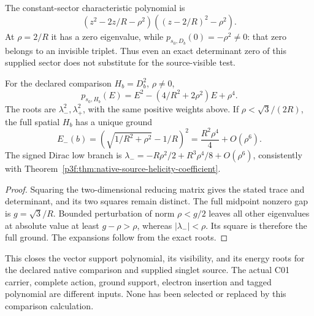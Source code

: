 \documentclass[12pt,a4paper]{article}
\begin{document}
\begin{corollary}
\label{p4:cor:native-source-determinant-zero}
The constant-sector characteristic polynomial is
\[
 (z^2-2z/R-\rho^2)((z-2/R)^2-\rho^2).
\]
At \(\rho=2/R\) it has a zero eigenvalue, while
\(p_{s_0,D_b}(0)=-\rho^2\ne0\): that zero belongs to an invisible
triplet. Thus even an exact determinant zero of this supplied sector
does not substitute for the source-visible test.
\end{corollary}

\begin{corollary}
\label{p4:cor:native-source-square-polynomial}
For the declared comparison \(H_b=D_b^2\), \(\rho\ne0\),
\begin{equation}
 p_{s_0,H_b}(E)=E^2-(4/R^2+2\rho^2)E+\rho^4.
 \label{p4:eq:native-source-energy-polynomial}
\end{equation}
The roots are \(\lambda_-^2,\lambda_+^2\), with the same positive
weights above. If \(\rho<\sqrt3/(2R)\), the full spatial \(H_b\)
has a unique ground
\begin{equation}
 E_-(b)=\left(\sqrt{1/R^2+\rho^2}-1/R\right)^2
       =\frac{R^2\rho^4}{4}+O(\rho^6).
 \label{p4:eq:native-source-quartic-energy}
\end{equation}
The signed Dirac low branch is
\(\lambda_-=-R\rho^2/2+R^3\rho^4/8+O(\rho^6)\), consistently with
Theorem~\ref{p3f:thm:native-source-helicity-coefficient}.
\end{corollary}
\begin{proof}
Squaring the two-dimensional reducing matrix gives the stated trace
and determinant, and its two squares remain distinct. The full
midpoint nonzero gap is \(g=\sqrt3/R\). Bounded perturbation of norm
\(\rho<g/2\) leaves all other eigenvalues at absolute value at least
\(g-\rho>\rho\), whereas \(|\lambda_-|<\rho\). Its square is
therefore the full ground. The expansions follow from the exact roots.
\end{proof}

This closes the vector support polynomial, its visibility, and its
energy roots for the declared native comparison and supplied singlet
source. The actual C01 carrier, complete action, ground support,
electron insertion and tagged polynomial are different inputs. None
has been selected or replaced by this comparison calculation.

\end{document}
